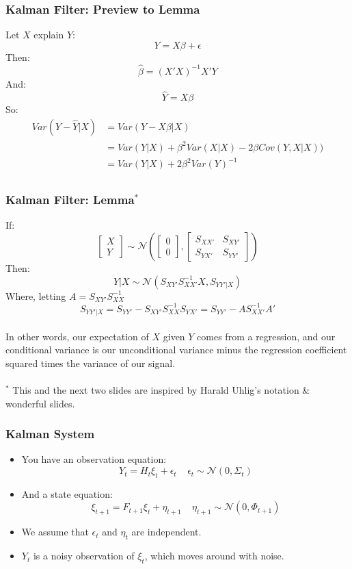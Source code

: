 \documentclass{beamer}
\begin{document}
\begin{frame}
\frametitle[alignment=center]{Kalman Filter: Preview to Lemma}
Let $X$ explain $Y$:
$$Y=X\beta+\epsilon$$
Then:
$$\hat{\beta}=(X'X)^{-1}X'Y$$
And:
$$\hat{Y}=X\beta$$
So:
\begin{align*}
Var(Y-\hat{Y}|X) & =Var(Y-X\beta|X)\\
 & =Var(Y|X)+\beta^2Var(X|X)-2\beta Cov(Y, X|X))\\
  & =Var(Y|X)+2\beta^2 Var(Y)^{-1}\\
\end{align*}
\end{frame}

\begin{frame}
\frametitle[alignment=center]{Kalman Filter: Lemma$^*$}
If:
$$\left[\begin{array}{c}X \\ Y\end{array}\right]\sim\mathcal{N}\left(\left[\begin{array}{c}0 \\ 0\end{array}\right],\left[\begin{array}{cc}S_{XX'}  & S_{XY'} \\ S_{YX'} & S_{YY'}\end{array}\right]\right)$$
Then:
$$Y|X\sim\mathcal{N}\left(S_{XY'}S_{XX'}^{-1}X,S_{YY'|X}\right)$$
Where, letting $A=S_{XY'}S_{XX}^{-1}$
$$S_{YY'|X}=S_{YY'}-S_{XY'}S_{XX}^{-1}S_{YX'}=S_{YY'}-AS_{XX'}^{-1}A'$$
\ \\
In other words, our expectation of $X$ given $Y$ comes from a regression, and our conditional variance is our unconditional variance minus the regression coefficient squared times the variance of our signal.
\ \\
\footnotesize
\ \\
$^*$ This and the next two slides are inspired by Harald Uhlig's notation \& wonderful slides.
\end{frame}

\begin{frame}
\frametitle[alignment=center]{Kalman System}
\begin{itemize}
\item You have an observation equation:
$$Y_t=H_t\xi_t+\epsilon_t\ \ \ \ \ \epsilon_t\sim\mathcal{N}\left(0,\Sigma_t\right)$$
\item And a state equation:
$$\xi_{t+1}=F_{t+1}\xi_t+\eta_{t+1}\ \ \ \ \ \eta_{t+1}\sim\mathcal{N}\left(0,\Phi_{t+1}\right)$$
\item We assume that $\epsilon_t$ and $\eta_t$ are independent.
\bigskip
\item $Y_t$ is a noisy observation of $\xi_t$, which moves around with noise.
\end{itemize}
\end{frame}
\end{document}
